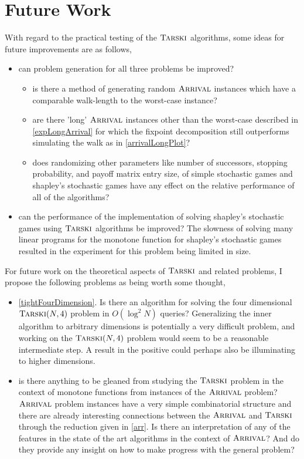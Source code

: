 \section{Future Work}
With regard to the practical testing of the $\textsc{Tarski}$ algorithms, some ideas for future improvements are as follows,
\begin{itemize}
  \item can problem generation for all three problems be improved?
    \begin{itemize}
      \item is there a method of generating random $\textsc{Arrival}$ instances which have a comparable walk-length to the worst-case instance?
      \item are there 'long' $\textsc{Arrival}$ instances other than the worst-case described in \cref{expLongArrival} for which the fixpoint decomposition still
        outperforms simulating the walk as in \cref{arrivalLongPlot}?
      \item does randomizing other parameters like number of successors, stopping probability,
        and payoff matrix entry size, of simple stochastic games and shapley's stochastic games have any effect on
        the relative performance of all of the algorithms?
    \end{itemize}
  \item can the performance of the implementation of solving shapley's stochastic games using $\textsc{Tarski}$ algorithms be improved?
    The slowness of solving many linear programs for the monotone function for shapley's stochastic games resulted
    in the experiment for this problem being limited in size.
\end{itemize}
For future work on the theoretical aspects of $\textsc{Tarski}$ and related problems, I propose the following problems as being worth some thought,
\begin{itemize}
  \item \cref{tightFourDimension}. Is there an algorithm for solving the four dimensional $\textsc{Tarski}(N, 4)$ problem
    in $O(\log^2 N)$ queries? Generalizing the inner algorithm to arbitrary dimensions is 
    potentially a very difficult problem, and
    working on the $\textsc{Tarski}(N, 4)$ problem would seem to be a reasonable intermediate step. A result in the positive
    could perhaps also be illuminating to higher dimensions.
  \item is there anything to be gleaned from studying the $\textsc{Tarski}$ problem in the context of monotone functions from instances of the $\textsc{Arrival}$
    problem? $\textsc{Arrival}$ problem instances have a very simple combinatorial structure and there are already interesting connections between
    the $\textsc{Arrival}$ and $\textsc{Tarski}$ through the reduction given in \cref{arr}. Is there an interpretation of any of the features in the state
    of the art algorithms in the context of $\textsc{Arrival}$? And do they provide any insight on how to make progress with the general problem?
\end{itemize}
